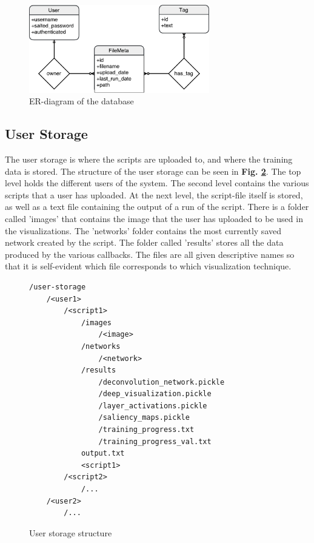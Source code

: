 \begin{figure}[h!]
    \centering
        \includegraphics[width=0.7\textwidth]{fig/database-diagram.pdf}
        \caption{ER-diagram of the database}
        \label{database}
\end{figure}

\subsection{User Storage}

The user storage is where the scripts are uploaded to, and where the training data is stored. The structure of the user storage can be seen in \textbf{Fig. \ref{struct2}}. The top level holds the different users of the system. The second level contains the various scripts that a user has uploaded. At the next level, the script-file itself is stored, as well as a text file containing the output of a run of the script. There is a folder called 'images' that contains the image that the user has uploaded to be used in the visualizations. The 'networks' folder contains the most currently saved network created by the script. The folder called 'results' stores all the data produced by the various callbacks. The files are all given descriptive names so that it is self-evident which file corresponds to which visualization technique.

\begin{figure}[ht]
\begin{verbatim}
/user-storage
    /<user1>
        /<script1>
            /images
                /<image>
            /networks
                /<network>
            /results
                /deconvolution_network.pickle
                /deep_visualization.pickle
                /layer_activations.pickle
                /saliency_maps.pickle
                /training_progress.txt
                /training_progress_val.txt
            output.txt
            <script1>
        /<script2>
            /...
    /<user2>
        /...
\end{verbatim}
\caption{User storage structure}
\label{struct2}
\end{figure}

